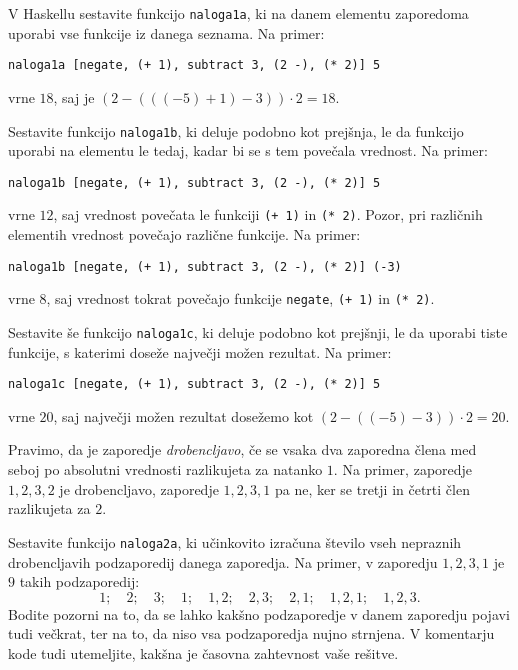 \documentclass[arhiv]{../izpit}
\begin{document}


\podnaloga[10 točk]
V Haskellu sestavite funkcijo \verb|naloga1a|, ki na danem elementu zaporedoma uporabi vse funkcije iz danega seznama.
Na primer:
\begin{verbatim}
naloga1a [negate, (+ 1), subtract 3, (2 -), (* 2)] 5
\end{verbatim}
vrne $18$, saj je $(2 - (((-5) + 1) - 3)) \cdot 2 = 18$.

\podnaloga[10 točk]
Sestavite funkcijo \verb|naloga1b|, ki deluje podobno kot prejšnja, le da funkcijo uporabi na elementu le tedaj, kadar bi se s tem povečala vrednost.
Na primer:
\begin{verbatim}
naloga1b [negate, (+ 1), subtract 3, (2 -), (* 2)] 5
\end{verbatim}
vrne $12$, saj vrednost povečata le funkciji \verb|(+ 1)| in \verb|(* 2)|.
Pozor, pri različnih elementih vrednost povečajo različne funkcije.
Na primer:
\begin{verbatim}
naloga1b [negate, (+ 1), subtract 3, (2 -), (* 2)] (-3)
\end{verbatim}
vrne $8$, saj vrednost tokrat povečajo funkcije \verb|negate|, \verb|(+ 1)| in \verb|(* 2)|.

\podnaloga[10 točk]
Sestavite še funkcijo \verb|naloga1c|, ki deluje podobno kot prejšnji, le da uporabi tiste funkcije, s katerimi doseže največji možen rezultat.
Na primer:
\begin{verbatim}
naloga1c [negate, (+ 1), subtract 3, (2 -), (* 2)] 5
\end{verbatim}
vrne $20$, saj največji možen rezultat dosežemo kot $(2 - ((-5) - 3)) \cdot 2 = 20$.



Pravimo, da je zaporedje \emph{drobencljavo}, če se vsaka dva zaporedna člena med seboj po absolutni vrednosti razlikujeta za natanko $1$. Na primer, zaporedje $1, 2, 3, 2$ je drobencljavo, zaporedje $1, 2, 3, 1$ pa ne, ker se tretji in četrti člen razlikujeta za $2$.

\podnaloga[10 točk]
  Sestavite funkcijo \texttt{naloga2a}, ki učinkovito izračuna število vseh nepraznih drobencljavih podzaporedij danega zaporedja.
  Na primer, v zaporedju $1, 2, 3, 1$ je $9$ takih podzaporedij:
  \[
    1; \quad 2; \quad 3; \quad 1; \quad 1, 2; \quad 2, 3; \quad 2, 1; \quad 1, 2, 1; \quad 1, 2, 3.
  \]
  Bodite pozorni na to, da se lahko kakšno podzaporedje v danem zaporedju pojavi tudi večkrat, ter na to, da niso vsa podzaporedja nujno strnjena. V komentarju kode tudi utemeljite, kakšna je časovna zahtevnost vaše rešitve.
\end{document}
